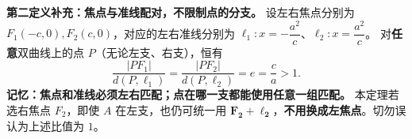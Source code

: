 \begin{statementbox}
\end{statementbox}\clearpage\begin{statementbox}

  \medskip
  \textbf{\textcolor{CStatement}{第二定义补充：焦点与准线配对，不限制点的分支。}}
  设左右焦点分别为 $F_1(-c,0),F_2(c,0)$，对应的左右准线分别为
  $\ell_1:x=-\dfrac{a^2}{c}$、$\ell_2:x=\dfrac{a^2}{c}$。
  对\textbf{任意}双曲线上的点 $P$（无论左支、右支），恒有
  \[
    \boxed{\frac{|PF_1|}{d(P,\ell_1)}
    =\frac{|PF_2|}{d(P,\ell_2)}
    =e=\frac ca>1}.
  \]
  \textbf{记忆：焦点和准线必须左右匹配；点在哪一支都能使用任意一组匹配。}
  本定理若选右焦点 $F_2$，即使 $A$ 在左支，也仍可统一用
  $\boldsymbol{F_2+\ell_2}$，\textbf{不用换成左焦点}。切勿误认为上述比值为 $1$。
\end{statementbox}
